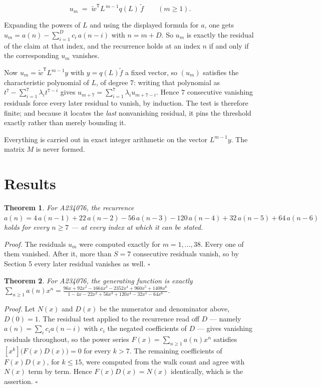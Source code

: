 \documentclass[11pt]{article}
\newtheorem{theorem}{Theorem}
\theoremstyle{definition}
\begin{document}
\[u_m \;=\; \tilde w^{\mathsf T} L^{\,m-1} q(L)\,\tilde f \qquad (m \ge 1).\]

Expanding the powers of $L$ and using the displayed formula for $a$, one gets $u_m = a(n) - \sum_{i=1}^{D} c_i\,a(n-i)$ with $n = m + D$. So $u_m$ is exactly the residual of the claim at that index, and the recurrence holds at an index $n$ if and only if the corresponding $u_m$ vanishes.

Now $u_m = \tilde w^{\mathsf T} L^{m-1} y$ with $y = q(L)\tilde f$ a fixed vector, so $(u_m)$ satisfies the characteristic polynomial of $L$, of degree $7$: writing that polynomial as $t^{7} - \sum_{i=1}^{7} \lambda_i t^{7-i}$ gives $u_{m+7} = \sum_{i=1}^{7} \lambda_i u_{m+7-i}$. Hence $7$ consecutive vanishing residuals force every later residual to vanish, by induction. The test is therefore finite; and because it locates the {\itshape last} nonvanishing residual, it pins the threshold exactly rather than merely bounding it.

Everything is carried out in exact integer arithmetic on the vector $L^{m-1}y$. The matrix $M$ is never formed.

\section{Results}

\begin{theorem} For A234076, the recurrence $a(n) = 4\,a(n-1) + 22\,a(n-2) - 56\,a(n-3) - 120\,a(n-4) + 32\,a(n-5) + 64\,a(n-6)$ holds for every $n \ge 7$ --- at every index at which it can be stated.\end{theorem}

{\itshape Proof.} The residuals $u_m$ were computed exactly for $m = 1,\dots,38$. Every one of them vanished. After it, more than $S = 7$ consecutive residuals vanish, so by Section 5 every later residual vanishes as well. $\square$

\begin{theorem} For A234076, the generating function is exactly $\sum_{n\ge 1} a(n)x^n = \frac{96x + 92x^{2} - 1664x^{3} - 2352x^{4} + 960x^{5} + 1408x^{6}}{1 - 4x - 22x^{2} + 56x^{3} + 120x^{4} - 32x^{5} - 64x^{6}}$.\end{theorem}

{\itshape Proof.} Let $N(x)$ and $D(x)$ be the numerator and denominator above, $D(0)=1$. The residual test applied to the recurrence read off $D$ --- namely $a(n) = \sum_i c_i a(n-i)$ with $c_i$ the negated coefficients of $D$ --- gives vanishing residuals throughout, so the power series $F(x)=\sum_{n\ge 1}a(n)x^n$ satisfies $[x^k]\bigl(F(x)D(x)\bigr) = 0$ for every $k > 7$. The remaining coefficients of $F(x)D(x)$, for $k \le 15$, were computed from the walk count and agree with $N(x)$ term by term. Hence $F(x)D(x) = N(x)$ identically, which is the assertion. $\square$
\end{document}

